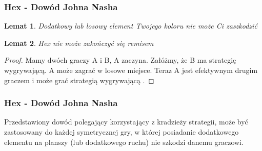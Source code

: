 \documentclass[polish,envcountsect,10pt]{beamer}
\newtheorem{lmt}{Lemat}
\begin{document}
                \begin{frame}
                    \frametitle{Hex - Dowód Johna Nasha}
                    \begin{lmt}
                        Dodatkowy lub losowy element Twojego koloru nie może Ci zaszkodzić
                    \end{lmt} \pause
                    \begin{lmt}
                        Hex nie może zakończyć się remisem
                    \end{lmt} \pause
                    \begin{proof}
                        Mamy dwóch graczy A i B, A zaczyna. Załóżmy, że B ma strategię wygrywającą. A może zagrać w losowe miejsce. Teraz A jest efektywnym drugim graczem i może grać strategią wygrywającą \cite{hex_proof}.
                    \end{proof}
                \end{frame}
                \begin{frame}
                    \frametitle{Hex - Dowód Johna Nasha}
                    Przedstawiony dowód polegający korzystający z kradzieży strategii, może być zastosowany do każdej symetrycznej gry, w której posiadanie dodatkowego elementu na planszy (lub dodatkowego ruchu) nie szkodzi danemu graczowi.
                \end{frame} 
\end{document}

